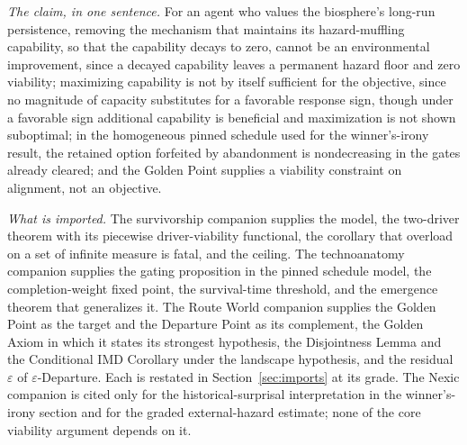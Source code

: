 \emph{The claim, in one sentence.} For an agent who values the
biosphere's long-run persistence, removing the mechanism that
maintains its hazard-muffling capability, so that the capability decays
to zero, cannot be an environmental improvement, since a decayed
capability leaves a permanent hazard floor and zero viability;
maximizing capability is not by itself sufficient for the objective, since no magnitude of capacity substitutes for a favorable response sign, though under a favorable sign additional capability is beneficial and maximization is not shown suboptimal; in the
homogeneous pinned schedule used for the winner's-irony result, the
retained option forfeited by abandonment is nondecreasing in the gates
already cleared; and the Golden Point supplies a viability constraint on
alignment, not an objective.

\emph{What is imported.} The survivorship companion \cite{GoldenSurvivorship}
supplies the model, the two-driver theorem with its piecewise
driver-viability functional, the corollary that overload on a set of
infinite measure is fatal, and the ceiling. The
technoanatomy companion \cite{GoldenTechnoanatomy} supplies the gating proposition
in the pinned schedule model, the completion-weight fixed point, the
survival-time threshold, and the emergence theorem that
generalizes it. The Route World companion \cite{GoldenRouteWorld}
supplies the Golden Point as the target and the Departure Point as its
complement, the Golden Axiom in which it states its strongest
hypothesis, the Disjointness Lemma and the Conditional IMD Corollary
under the landscape hypothesis, and the residual $\varepsilon$ of
$\varepsilon$-Departure. Each is restated in Section~\ref{sec:imports}
at its grade. The Nexic companion \cite{Nexus} is cited only for the
historical-surprisal interpretation in the winner's-irony section and
for the graded external-hazard estimate; none of the core viability
argument depends on it.

